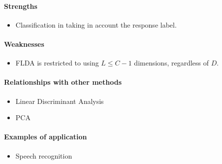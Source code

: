 \paragraph{Strengths}
\begin{itemize}
    \item Classification in taking in account the response label.
\end{itemize}

\paragraph{Weaknesses}
\begin{itemize}
    \item FLDA is restricted to using $L\leq C-1$ dimensions, regardless of $D$.
\end{itemize}

\paragraph{Relationships with other methods}
\begin{itemize}
    \item Linear Discriminant Analysis
    \item PCA
\end{itemize}

\paragraph{Examples of application}
\begin{itemize}
    \item Speech recognition
\end{itemize}


